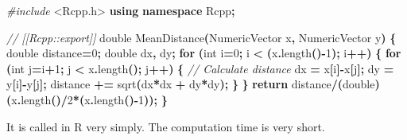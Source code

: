 \documentclass[
  12pt,
  american,
  a4paper,
  extrafontsizes,onecolumn,openright
  ]{memoir}
\newenvironment{Shaded}{\begin{snugshade}}{\end{snugshade}}
\newcommand{\CommentTok}[1]{\textcolor[rgb]{0.56,0.35,0.01}{\textit{#1}}}
\newcommand{\ControlFlowTok}[1]{\textcolor[rgb]{0.13,0.29,0.53}{\textbf{#1}}}
\newcommand{\DataTypeTok}[1]{\textcolor[rgb]{0.13,0.29,0.53}{#1}}
\newcommand{\DecValTok}[1]{\textcolor[rgb]{0.00,0.00,0.81}{#1}}
\newcommand{\FunctionTok}[1]{\textcolor[rgb]{0.13,0.29,0.53}{\textbf{#1}}}
\newcommand{\ImportTok}[1]{#1}
\newcommand{\KeywordTok}[1]{\textcolor[rgb]{0.13,0.29,0.53}{\textbf{#1}}}
\newcommand{\NormalTok}[1]{#1}
\newcommand{\OperatorTok}[1]{\textcolor[rgb]{0.81,0.36,0.00}{\textbf{#1}}}
\newcommand{\OtherTok}[1]{\textcolor[rgb]{0.56,0.35,0.01}{#1}}
\newcommand{\PreprocessorTok}[1]{\textcolor[rgb]{0.56,0.35,0.01}{\textit{#1}}}
\newcommand{\SpecialCharTok}[1]{\textcolor[rgb]{0.81,0.36,0.00}{\textbf{#1}}}
\newlength{\rf}
\begin{document}
\begin{Shaded}
\begin{Highlighting}[]
\PreprocessorTok{\#include }\ImportTok{\textless{}Rcpp.h\textgreater{}}
\KeywordTok{using} \KeywordTok{namespace}\NormalTok{ Rcpp}\OperatorTok{;}

\CommentTok{// [[Rcpp::export]]}
\DataTypeTok{double}\NormalTok{ MeanDistance}\OperatorTok{(}\NormalTok{NumericVector x}\OperatorTok{,}\NormalTok{ NumericVector y}\OperatorTok{)} \OperatorTok{\{}
  \DataTypeTok{double}\NormalTok{ distance}\OperatorTok{=}\DecValTok{0}\OperatorTok{;}
  \DataTypeTok{double}\NormalTok{ dx}\OperatorTok{,}\NormalTok{ dy}\OperatorTok{;}
  \ControlFlowTok{for} \OperatorTok{(}\DataTypeTok{int}\NormalTok{ i}\OperatorTok{=}\DecValTok{0}\OperatorTok{;}\NormalTok{ i }\OperatorTok{\textless{}} \OperatorTok{(}\NormalTok{x}\OperatorTok{.}\NormalTok{length}\OperatorTok{(){-}}\DecValTok{1}\OperatorTok{);}\NormalTok{ i}\OperatorTok{++)} \OperatorTok{\{}
    \ControlFlowTok{for} \OperatorTok{(}\DataTypeTok{int}\NormalTok{ j}\OperatorTok{=}\NormalTok{i}\OperatorTok{+}\DecValTok{1}\OperatorTok{;}\NormalTok{ j }\OperatorTok{\textless{}}\NormalTok{ x}\OperatorTok{.}\NormalTok{length}\OperatorTok{();}\NormalTok{ j}\OperatorTok{++)} \OperatorTok{\{}
    \CommentTok{// Calculate distance}
\NormalTok{        dx }\OperatorTok{=}\NormalTok{ x}\OperatorTok{[}\NormalTok{i}\OperatorTok{]{-}}\NormalTok{x}\OperatorTok{[}\NormalTok{j}\OperatorTok{];}
\NormalTok{        dy }\OperatorTok{=}\NormalTok{ y}\OperatorTok{[}\NormalTok{i}\OperatorTok{]{-}}\NormalTok{y}\OperatorTok{[}\NormalTok{j}\OperatorTok{];}
\NormalTok{        distance }\OperatorTok{+=}\NormalTok{ sqrt}\OperatorTok{(}\NormalTok{dx}\OperatorTok{*}\NormalTok{dx }\OperatorTok{+}\NormalTok{ dy}\OperatorTok{*}\NormalTok{dy}\OperatorTok{);}
    \OperatorTok{\}}
  \OperatorTok{\}}
  \ControlFlowTok{return}\NormalTok{ distance}\OperatorTok{/(}\DataTypeTok{double}\OperatorTok{)(}\NormalTok{x}\OperatorTok{.}\NormalTok{length}\OperatorTok{()/}\DecValTok{2}\OperatorTok{*(}\NormalTok{x}\OperatorTok{.}\NormalTok{length}\OperatorTok{(){-}}\DecValTok{1}\OperatorTok{));}
\OperatorTok{\}}
\end{Highlighting}
\end{Shaded}

\normalsize

It is called in R very simply.
The computation time is very short.

\scriptsize

\begin{Shaded}
\end{Shaded}
\end{document}
